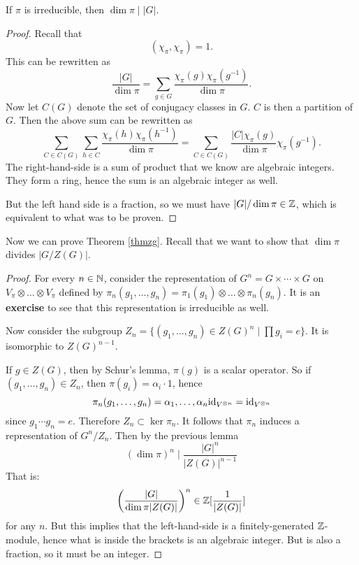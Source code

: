 \documentclass[11pt, english]{article}
\begin{document}
\begin{lemma}
 If $\pi$ is irreducible, then $\dim \pi \mid \lvert G \rvert$.
\end{lemma}
\begin{proof}
Recall that
$$
(\chi_\pi , \chi_\pi) = 1.
$$
This can be rewritten as
$$
\frac{\lvert G \rvert}{\dim \pi} = \sum_{g \in G} \frac{\chi_\pi(g) \chi_\pi(g^{-1})}{\dim \pi}.
$$
Now let $C(G)$ denote the set of conjugacy classes in $G$. $C$ is then a partition of $G$. Then the above sum can be rewritten as
$$
\sum_{C \in C(G)} \sum_{h \in C} \frac{\chi_\pi(h) \chi_\pi(h^{-1})}{\dim \pi} = \sum_{C \in C(G)}  \frac{\lvert C \rvert \chi_\pi(g) }{\dim \pi}  \chi_\pi(g^{-1}).
$$
The right-hand-side is a sum of product that we know are algebraic integers. They form a ring, hence the sum is an algebraic integer as well.

But the left hand side is a fraction, so we must have $\lvert G \rvert / \dim \pi \in \mathbb{Z}$, which is equivalent to what was to be proven.
\end{proof}

Now we can prove Theorem \ref{thmzg}. Recall that we want to show that $\dim \pi$ divides $\lvert G/Z(G) \rvert$. 

\begin{proof}
 For every $n \in \mathbb{N}$, consider the representation of $G^n = G \times \cdots \times G$ on $V_\pi \otimes \ldots \otimes V_\pi$ defined by $\pi_n(g_1,\ldots,g_n) = \pi_1(g_1) \otimes \ldots \otimes \pi_n(g_n)$.  It is an \textbf{exercise} to see that this representation is irreducible as well.

Now consider the subgroup $Z_n = \{ (g_1,\ldots,g_n) \in Z(G)^n \mid \prod g_i = e \}$. It is isomorphic to $Z(G)^{n-1}$. 

If $g \in Z(G)$, then by Schur's lemma, $\pi(g)$ is a scalar operator. So if $(g_1,\ldots,g_n) \in Z_n$, then $\pi(g_i)=\alpha_i \cdot 1$, hence
\[
\pi_n(g_1,\ldots,g_n) = \alpha_1,\ldots,\alpha_n \text{id}_{V^{\otimes n}} = \text{id}_{V^{\otimes n}}
\]
since $g_1\cdots g_n = e$. Therefore $Z_n \subset \ker \pi_n$. It follows that $\pi_n$ induces a representation of $G^n/Z_n$. Then by the previous lemma
$$
(\dim \pi)^n \mid \frac{\lvert G \rvert^n }{\lvert Z(G) \rvert ^{n-1}}
$$
That is:
$$
\left( \frac{\lvert G \rvert}{\dim \pi \lvert Z(G) \rvert } \right)^n \in \mathbb{Z}[\frac{1}{\lvert Z(G) \rvert}]
$$
for any $n$. But this implies that the left-hand-side is a finitely-generated $\mathbb{Z}$-module, hence what is inside the brackets is an algebraic integer. But is also a fraction, so it must be an integer.
\end{proof}
\end{document}
